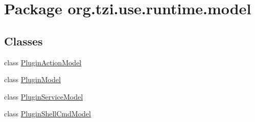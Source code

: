 \hypertarget{namespaceorg_1_1tzi_1_1use_1_1runtime_1_1model}{\section{Package org.\-tzi.\-use.\-runtime.\-model}
\label{namespaceorg_1_1tzi_1_1use_1_1runtime_1_1model}
}
\subsection*{Classes}
\begin{DoxyCompactItemize}
\item 
class \hyperlink{classorg_1_1tzi_1_1use_1_1runtime_1_1model_1_1_plugin_action_model}{Plugin\-Action\-Model}
\item 
class \hyperlink{classorg_1_1tzi_1_1use_1_1runtime_1_1model_1_1_plugin_model}{Plugin\-Model}
\item 
class \hyperlink{classorg_1_1tzi_1_1use_1_1runtime_1_1model_1_1_plugin_service_model}{Plugin\-Service\-Model}
\item 
class \hyperlink{classorg_1_1tzi_1_1use_1_1runtime_1_1model_1_1_plugin_shell_cmd_model}{Plugin\-Shell\-Cmd\-Model}
\end{DoxyCompactItemize}
